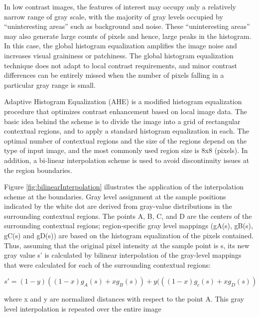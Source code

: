 In low contrast images, the features of interest may occupy only a
relatively narrow range of gray scale, with the majority of gray levels occupied by
“uninteresting areas” such as background and noise. These “uninteresting areas”
may also generate large counts of pixels and hence, large peaks in the
histogram. In this case, the global histogram equalization amplifies the image
noise and increases visual graininess or patchiness. The global histogram
equalization technique does not adapt to local contrast requirements, and minor
contrast differences can be entirely missed when the number of pixels falling in a
particular gray range is small.

Adaptive Histogram Equalization (AHE) is a modified histogram
equalization procedure that optimizes contrast enhancement based on local
image data. The basic idea behind the scheme is to divide the image into a grid
of rectangular contextual regions, and to apply a standard histogram equalization
in each. The optimal number of contextual regions and the size of the regions
depend on the type of input image, and the most commonly used region size is
8x8 (pixels). In addition, a bi-linear interpolation scheme is used to avoid
discontinuity issues at the region boundaries.

Figure \ref{fig:bilinearInterpolation} illustrates the application of the interpolation scheme at the
boundaries. Gray level assignment at the sample positions indicated by the white
dot are derived from gray-value distributions in the surrounding contextual regions. The points A, B, C, and D are the centers of the surrounding contextual
regions; region-specific gray level mappings (gA(s), gB(s), gC(s) and gD(s)) are
based on the histogram equalization of the pixels contained. Thus, assuming that
the original pixel intensity at the sample point is s, its new gray value s’ is
calculated by bilinear interpolation of the gray-level mappings that were
calculated for each of the surrounding contextual regions:

\begin{equation}
	s'=(1-y)((1-x)g_{A}(s) + xg_{B}(s))+y(((1-x)g_{c}(s)+xg_{D}(s))
\end{equation}

where x and y are normalized distances with respect to the point A. This
gray level interpolation is repeated over the entire image


